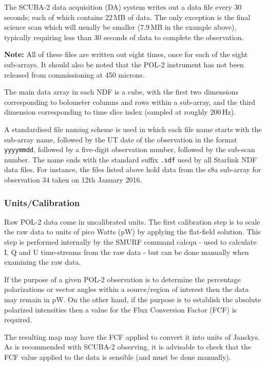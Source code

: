 The SCUBA-2 data acquisition (DA) system writes out a data file every
30 seconds; each of which contains 22\,MB of data. The only exception
is the final science scan which will usually be smaller (7.9\,MB in
the example above), typically requiring less than 30 seconds of data
to complete the observation.

\textbf{Note:} All of these files are written out eight times, once
for each of the eight sub-arrays. It should also be noted that the POL-2 instrument has not
been released from commissioning at 450 microns.

The main data array in each NDF is a cube, with the first two
dimensions corresponding to bolometer columns and rows within a sub-array,
and the third dimension corresponding to time slice index (sampled at roughly 200\,Hz).

A standardised file naming scheme is used in which each file name starts
with the sub-array name, followed by the UT date of the observation in
the format \texttt{yyyymmdd}, followed by a five-digit observation
number, followed by the sub-scan number. The name ends with the standard
suffix \texttt{.sdf} used by all Starlink NDF data files. For instance, the files
listed above hold data from the s8a sub-array for observation 34 taken on
12th January 2016.




\subsubsection*{Units/Calibration}

Raw POL-2 data come in uncalibrated units. The first calibration
step is to scale the raw data to units of pico Watts (pW)
by applying the flat-field solution. This step is performed internally
by the SMURF command calcqu - used to calculate I, Q and U time-streams from
the raw data - but can be done manually when examining the raw
data.

If the purpose of a given POL-2 observation is to determine the percentage
polarizations or vector angles within a source/region of interest then
the data may remain in pW. On the other hand, if the purpose is to
establish the absolute polarized intensities then a value for the Flux
Conversion Factor (FCF) is required.

The resulting map may have the FCF applied to convert it into units of Janskys. As is
recommended with SCUBA-2 observing, it is advisable to check that the FCF value
applied to the data is sensible (and must be done manually).





